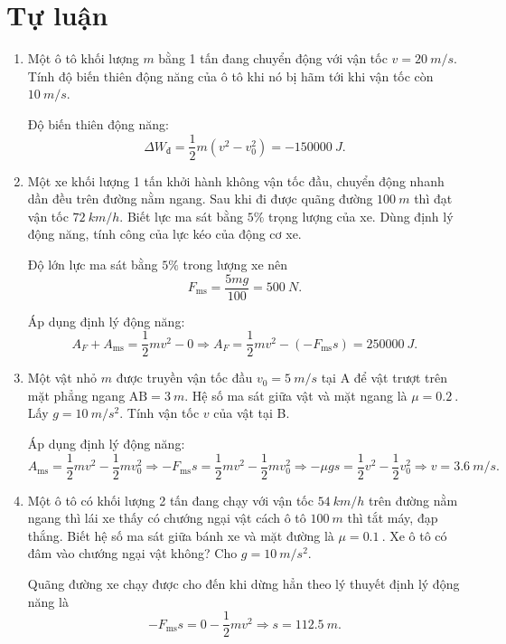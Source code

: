 \section{Tự luận}
\begin{enumerate}[label=\bfseries Câu \arabic*:]
	\item {}
	
	
	{
		Một ô tô khối lượng $m$ bằng 1 tấn đang chuyển động với vận tốc $v=\SI{20}{m/s}$. Tính độ biến thiên động năng của ô tô khi nó bị hãm tới khi vận tốc còn $\SI{10}{m/s}$.
	}
	
	\hideall
	{	
		Độ biến thiên động năng:
		$$\Delta W_\text{đ} = \dfrac{1}{2} m (v^2 - v_0^2) = \SI{-150000}{J}.$$
	}
	\item {}
	
	
	{
		Một xe khối lượng 1 tấn khởi hành không vận tốc đầu, chuyển động nhanh dần đều trên đường nằm ngang. Sau khi đi được quãng đường $\SI{100}{m}$ thì đạt vận tốc $\SI{72}{km/h}$. Biết lực ma sát bằng $5\%$ trọng lượng của xe. Dùng định lý động năng, tính công của lực kéo của động cơ xe.
	}
	
	\hideall
	{	
		Độ lớn lực ma sát bằng $5\%$ trong lượng xe nên $$F_\text{ms} = \dfrac{5mg}{100} = \SI{500}{N}.$$
		
		Áp dụng định lý động năng:
		$$A_F + A_\text{ms} = \dfrac{1}{2}mv^2 - 0 \Rightarrow A_F = \dfrac{1}{2} mv^2 - (-F_\text{ms}s) = \SI{250000}{J}.$$
	}
	\item {}
	
	
	{
		Một vật nhỏ $m$ được truyền vận tốc đầu $v_0=\SI{5}{m/s}$ tại A để vật trượt trên mặt phẳng ngang $\text{AB} = \SI{3}{m}$. Hệ số ma sát giữa vật và mặt ngang là $\mu=\SI{0.2}{}$. Lấy $g=\SI{10}{m/s^2}$. Tính vận tốc $v$ của vật tại B.
	}
	
	\hideall
	{	
		Áp dụng định lý động năng:
		$$A_\text{ms} = \dfrac{1}{2}mv^2 - \dfrac{1}{2}mv_0^2 \Rightarrow -F_\text{ms}s = \dfrac{1}{2}mv^2 - \dfrac{1}{2}mv_0^2 \Rightarrow -\mu g s = \dfrac{1}{2}v^2 - \dfrac{1}{2}v_0^2 \Rightarrow v = \SI{3.6}{m/s}.$$
	}
	\item {}
	
	
	{
		Một ô tô có khối lượng 2 tấn đang chạy với vận tốc $\SI{54}{km/h}$ trên đường nằm ngang thì lái xe thấy có chướng ngại vật cách ô tô $\SI{100}{m}$ thì tắt máy, đạp thắng. Biết hệ số ma sát giữa bánh xe và mặt đường là $\mu = \SI{0.1}{}$. Xe ô tô có đâm vào chướng ngại vật không? Cho $g=\SI{10}{m/s^2}$.
	}
	
	\hideall
	{	
		Quãng đường xe chạy được cho đến khi dừng hẳn theo lý thuyết định lý động năng là
		$$-F_\text{ms}s = 0 - \dfrac{1}{2}mv^2 \Rightarrow s = \SI{112.5}{m}.$$
		
}
\end{enumerate}
